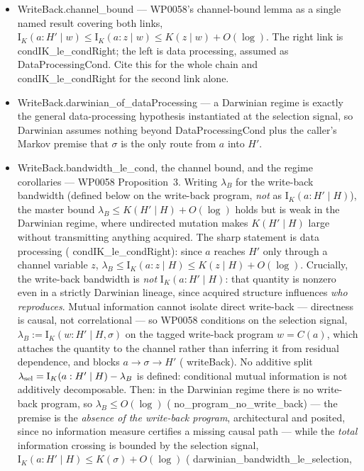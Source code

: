 \documentclass[11pt,a4paper]{article}
\newcommand{\lean}[1]{{\ttfamily\small
  \let\leanunderscore\_\def\_{\leanunderscore\allowbreak}#1}}
\newcommand{\Ik}{\mathrm{I}_K}
\begin{document}
\begin{itemize}[leftmargin=1.4em,itemsep=1pt]
proof (``enumerate programs, run $D$, collect outputs'') and leaves only undecidability assumed.
\item \lean{WriteBack.channel\_bound} --- WP0058's channel-bound lemma as a single named result
covering both links, $\Ik(a:H'\mid w)\le \Ik(a:z\mid w)\le K(z\mid w)+O(\log)$. The right link is
\lean{condIK\_le\_condRight}; the left is data processing, assumed as \lean{DataProcessingCond}.
Cite this for the whole chain and \lean{condIK\_le\_condRight} for the second link alone.
\item \lean{WriteBack.darwinian\_of\_dataProcessing} --- a Darwinian regime is exactly the general
data-processing hypothesis instantiated at the selection signal, so \lean{Darwinian} assumes
nothing beyond \lean{DataProcessingCond} plus the caller's Markov premise that $\sigma$ is the
only route from $a$ into $H'$.
\item \lean{WriteBack.bandwidth\_le\_cond}, the channel bound, and the regime corollaries
--- WP0058 Proposition~3. Writing $\lambda_B$ for the write-back bandwidth (defined below on the
write-back program, \emph{not} as $\Ik(a:H'\mid H)$), the master
bound $\lambda_B \le K(H'\mid H)+O(\log)$ holds but is weak in the Darwinian regime, where undirected
mutation makes $K(H'\mid H)$ large without transmitting anything acquired. The sharp statement is data
processing (\lean{condIK\_le\_condRight}): since $a$ reaches $H'$ only through a channel variable $z$,
$\lambda_B \le \Ik(a:z\mid H) \le K(z\mid H)+O(\log)$. Crucially, the write-back bandwidth is \emph{not} $\Ik(a:H'\mid H)$: that quantity is nonzero even in a
strictly Darwinian lineage, since acquired structure influences \emph{who reproduces}. Mutual information
cannot isolate direct write-back --- directness is causal, not correlational --- so WP0058 conditions on the
selection signal, $\lambda_B := \Ik(w : H'\mid H,\sigma)$ on the tagged write-back program $w=C(a)$, which attaches the quantity to the channel rather than inferring it from residual dependence, and blocks $a\to\sigma\to H'$ (\lean{writeBack}). No additive split $\lambda_{\rm sel}=\Ik(a:H'\mid H)-\lambda_B$ is defined: conditional mutual information is not additively decomposable. Then: in the Darwinian regime there is no write-back program, so $\lambda_B\le O(\log)$
(\lean{no\_program\_no\_write\_back}) --- the premise is the \emph{absence of the write-back program}, architectural and posited, since no information measure certifies a missing causal path --- while the \emph{total} information crossing is bounded by the
selection signal, $\Ik(a:H'\mid H)\le K(\sigma)+O(\log)$ (\lean{darwinian\_bandwidth\_le\_selection},

\end{itemize}
\end{document}

